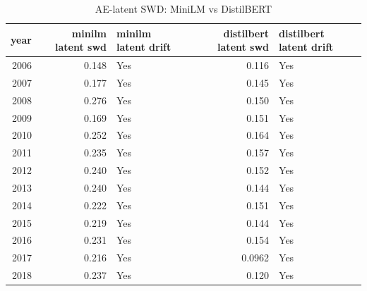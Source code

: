 \begin{table}[ht]
\centering
\caption{AE-latent SWD: MiniLM vs DistilBERT}
\label{tab:minilm_vs_distilbert_latent_swd}
\begin{tabular}{rrlrl}
\toprule
year & minilm latent swd & minilm latent drift & distilbert latent swd & distilbert latent drift \\
\midrule
2006 & 0.148 & Yes & 0.116 & Yes \\
2007 & 0.177 & Yes & 0.145 & Yes \\
2008 & 0.276 & Yes & 0.150 & Yes \\
2009 & 0.169 & Yes & 0.151 & Yes \\
2010 & 0.252 & Yes & 0.164 & Yes \\
2011 & 0.235 & Yes & 0.157 & Yes \\
2012 & 0.240 & Yes & 0.152 & Yes \\
2013 & 0.240 & Yes & 0.144 & Yes \\
2014 & 0.222 & Yes & 0.151 & Yes \\
2015 & 0.219 & Yes & 0.144 & Yes \\
2016 & 0.231 & Yes & 0.154 & Yes \\
2017 & 0.216 & Yes & 0.0962 & Yes \\
2018 & 0.237 & Yes & 0.120 & Yes \\
\bottomrule
\end{tabular}
\end{table}
